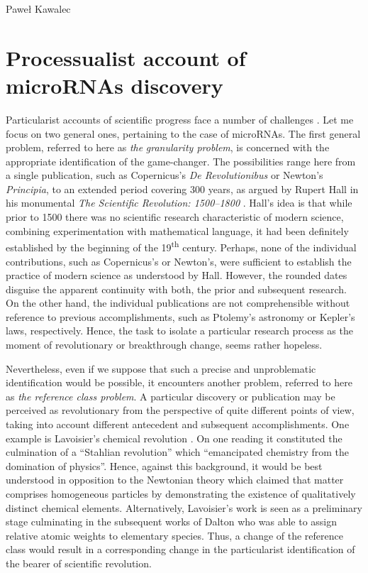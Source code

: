 \begin{artengenv}{Paweł Kawalec}
\section{Processualist account of microRNAs discovery }
Particularist accounts of scientific progress face a number of challenges
\parencite[][]{losee_theories_2004}. %
 Let me focus on two general ones, pertaining to the case of microRNAs. The first general problem, referred to here as \textit{the} \textit{granularity problem}, is concerned with the appropriate identification of the game-changer. The possibilities range here from a single publication, such as Copernicus's \textit{De Revolutionibus} or Newton's \textit{Principia}, to an extended period covering 300 years, as argued by Rupert Hall in his monumental \textit{The Scientific Revolution: 1500–1800} 
\parencite[][]{hall_scientific_1954}. %
 Hall's idea is that while prior to 1500 there was no scientific research characteristic of modern science, combining experimentation with mathematical language, it had been definitely established by the beginning of the 19\textsuperscript{th} century. Perhaps, none of the individual contributions, such as Copernicus's or Newton's, were sufficient to establish the practice of modern science as understood by Hall. However, the rounded dates disguise the apparent continuity with both, the prior and subsequent research. On the other hand, the individual publications are not comprehensible without reference to previous accomplishments, such as Ptolemy's astronomy or Kepler's laws, respectively. Hence, the task to isolate a particular research process as the moment of revolutionary or breakthrough change, seems rather hopeless.

Nevertheless, even if we suppose that such a precise and unproblematic identification would be possible, it encounters another problem, referred to here as \textit{the reference class problem}. A particular discovery or publication may be perceived as revolutionary from the perspective of quite different points of view, taking into account different antecedent and subsequent accomplishments. One example is Lavoisier's chemical revolution
\parencite[][p.66]{losee_theories_2004}. %
 On one reading it constituted the culmination of a ``Stahlian revolution'' which ``emancipated chemistry from the domination of physics''. Hence, against this background, it would be best understood in opposition to the Newtonian theory which claimed that matter comprises homogeneous particles by demonstrating the existence of qualitatively distinct chemical elements. Alternatively, Lavoisier's work is seen as a preliminary stage culminating in the subsequent works of Dalton who was able to assign relative atomic weights to elementary species. Thus, a change of the reference class would result in a corresponding change in the particularist identification of the bearer of scientific revolution.


\end{artengenv}
